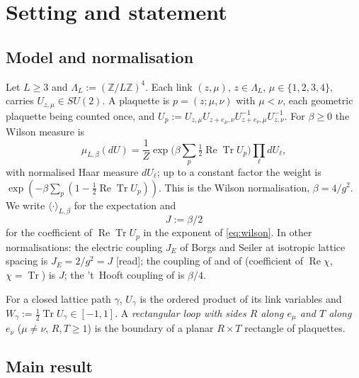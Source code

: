 \documentclass[11pt,a4paper]{article}
\theoremstyle{plain}
\theoremstyle{remark}
\numberwithin{equation}{section}
\newcommand{\Z}{\mathbb{Z}}
\newcommand{\Tr}{\operatorname{Tr}}
\newcommand{\ReTr}{\operatorname{Re}\operatorname{Tr}}
\newcommand{\st}[1]{\textsf{[#1]}}
\begin{document}
\section{Setting and statement}\label{sec:statement}

\subsection{Model and normalisation}
Let $L\ge3$ and $\Lambda_L:=(\Z/L\Z)^4$. Each link $(z,\mu)$, $z\in\Lambda_L$, $\mu\in\{1,2,3,4\}$, carries $U_{z,\mu}\in SU(2)$.
A plaquette is $p=(z;\mu,\nu)$ with $\mu<\nu$, each geometric plaquette being counted once, and
$U_p:=U_{z,\mu}U_{z+e_\mu,\nu}U_{z+e_\nu,\mu}^{-1}U_{z,\nu}^{-1}$. For $\beta\ge0$ the Wilson measure is
\begin{equation}\label{eq:wilson}
\mu_{L,\beta}(dU)=\frac1Z\exp\Big(\beta\sum_p\tfrac12\ReTr U_p\Big)\prod_\ell dU_\ell ,
\end{equation}
with normalised Haar measure $dU_\ell$; up to a constant factor the weight is $\exp(-\beta\sum_p(1-\frac12\ReTr U_p))$. This is the
Wilson normalisation, $\beta=4/g^2$. We write $\langle\cdot\rangle_{L,\beta}$ for the expectation and
\begin{equation}\label{eq:J}
J:=\beta/2
\end{equation}
for the coefficient of $\ReTr U_p$ in the exponent of \eqref{eq:wilson}. In other normalisations: the electric coupling $J_E$ of
Borgs and Seiler \cite[(II.2)--(II.4), p.~332]{BS83} at isotropic lattice spacing is $J_E=2/g^2=J$ \st{read}; the coupling of
\cite[(1.13)--(1.16)]{DF80} and of \cite{Fro79} (coefficient of $\operatorname{Re}\chi$, $\chi=\Tr$) is $J$; the 't~Hooft coupling of
\cite{CNS25} is $\beta/4$.

For a closed lattice path $\gamma$, $U_\gamma$ is the ordered product of its link variables and $W_\gamma:=\frac12\Tr U_\gamma\in
[-1,1]$. A \emph{rectangular loop with sides $R$ along $e_\mu$ and $T$ along $e_\nu$} ($\mu\ne\nu$, $R,T\ge1$) is the boundary of a
planar $R\times T$ rectangle of plaquettes.

\subsection{Main result}
\end{document}

